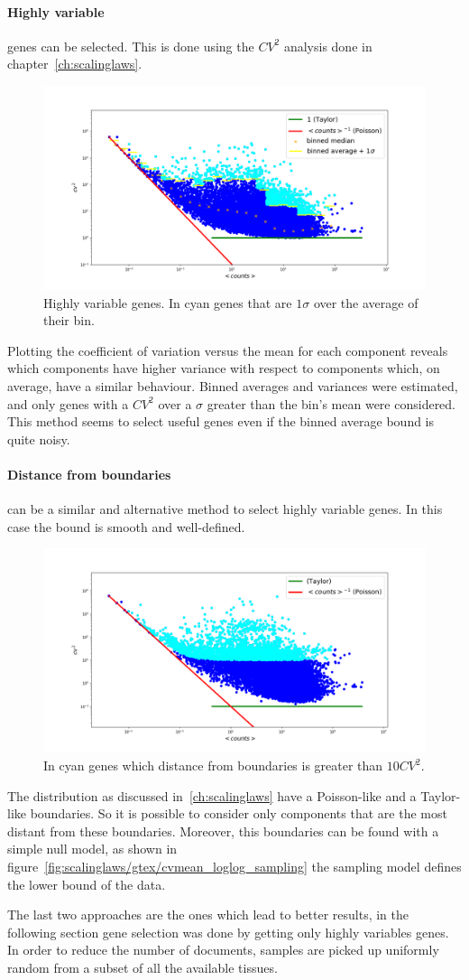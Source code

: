 \paragraph{Highly variable} genes can be selected. This is done using the $CV^2$ analysis done in chapter~\ref{ch:scalinglaws}.
\begin{figure}[htb!]
    \centering
    \includegraphics[width=0.8\linewidth]{pictures/topic/cvmean_oversigma.png}
    \caption{Highly variable genes. In cyan genes that are $1 \sigma$ over the average of their bin.}
    \label{fig:topic/cvmean_oversigma}
\end{figure}
Plotting the coefficient of variation versus the mean for each component reveals which components have higher variance with respect to components which, on average, have a similar behaviour. Binned averages and variances were estimated, and only genes with a $CV^2$ over a $\sigma$ greater than the bin's mean were considered. This method seems to select useful genes even if the binned average bound is quite noisy.

\paragraph{Distance from boundaries} can be a similar and alternative method to select highly variable genes. In this case the bound is smooth and well-defined.
\begin{figure}[htb!]
    \centering
    \includegraphics[width=0.8\linewidth]{pictures/topic/cvmean_oversampling.png}
    \caption{In cyan genes which distance from boundaries is greater than $10 CV^2$.}
    \label{fig:topic/cvmean_oversampling}
\end{figure}
The distribution as discussed in~\ref{ch:scalinglaws} have a Poisson-like and a Taylor-like boundaries. So it is possible to consider only components that are the most distant from these boundaries. Moreover, this boundaries can be found with a simple null model, as shown in figure~\ref{fig:scalinglaws/gtex/cvmean_loglog_sampling} the sampling model defines the lower bound of the data.

The last two approaches are the ones which lead to better results, in the following section gene selection was done by getting only highly variables genes.
In order to reduce the number of documents, samples are picked up uniformly random from a subset of all the available tissues.